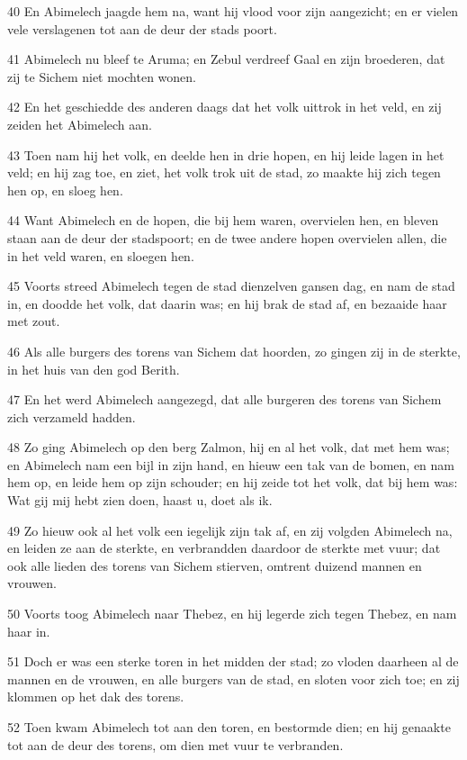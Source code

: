 \par 40 En Abimelech jaagde hem na, want hij vlood voor zijn aangezicht; en er vielen vele verslagenen tot aan de deur der stads poort.
\par 41 Abimelech nu bleef te Aruma; en Zebul verdreef Gaal en zijn broederen, dat zij te Sichem niet mochten wonen.
\par 42 En het geschiedde des anderen daags dat het volk uittrok in het veld, en zij zeiden het Abimelech aan.
\par 43 Toen nam hij het volk, en deelde hen in drie hopen, en hij leide lagen in het veld; en hij zag toe, en ziet, het volk trok uit de stad, zo maakte hij zich tegen hen op, en sloeg hen.
\par 44 Want Abimelech en de hopen, die bij hem waren, overvielen hen, en bleven staan aan de deur der stadspoort; en de twee andere hopen overvielen allen, die in het veld waren, en sloegen hen.
\par 45 Voorts streed Abimelech tegen de stad dienzelven gansen dag, en nam de stad in, en doodde het volk, dat daarin was; en hij brak de stad af, en bezaaide haar met zout.
\par 46 Als alle burgers des torens van Sichem dat hoorden, zo gingen zij in de sterkte, in het huis van den god Berith.
\par 47 En het werd Abimelech aangezegd, dat alle burgeren des torens van Sichem zich verzameld hadden.
\par 48 Zo ging Abimelech op den berg Zalmon, hij en al het volk, dat met hem was; en Abimelech nam een bijl in zijn hand, en hieuw een tak van de bomen, en nam hem op, en leide hem op zijn schouder; en hij zeide tot het volk, dat bij hem was: Wat gij mij hebt zien doen, haast u, doet als ik.
\par 49 Zo hieuw ook al het volk een iegelijk zijn tak af, en zij volgden Abimelech na, en leiden ze aan de sterkte, en verbrandden daardoor de sterkte met vuur; dat ook alle lieden des torens van Sichem stierven, omtrent duizend mannen en vrouwen.
\par 50 Voorts toog Abimelech naar Thebez, en hij legerde zich tegen Thebez, en nam haar in.
\par 51 Doch er was een sterke toren in het midden der stad; zo vloden daarheen al de mannen en de vrouwen, en alle burgers van de stad, en sloten voor zich toe; en zij klommen op het dak des torens.
\par 52 Toen kwam Abimelech tot aan den toren, en bestormde dien; en hij genaakte tot aan de deur des torens, om dien met vuur te verbranden.

